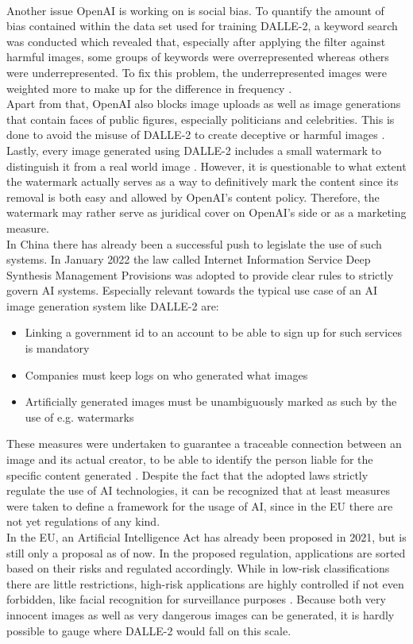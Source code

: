 \documentclass[10pt,twocolumn,twoside]{osajnl}
\begin{document}
\\
Another issue OpenAI is working on is social bias. To quantify the amount of bias contained within the data set used for training DALLE-2, a keyword search was conducted 
which revealed that, especially after applying the filter against harmful images, some groups of keywords were overrepresented whereas others were underrepresented. 
To fix this problem, the underrepresented images were weighted more to make up for the difference in frequency \cite{openaifilters}. 
\\
Apart from that, OpenAI also blocks image uploads as well as image generations that contain faces of public figures, especially politicians and celebrities. 
This is done to avoid the misuse of DALLE-2 to create deceptive or harmful images \cite{openaiimage}. 
\\
Lastly, every image generated using DALLE-2 includes a small watermark to distinguish it from a real world image \cite{openaicp}. 
However, it is questionable to what extent the watermark actually serves as a way to definitively mark the content since its removal is both easy and allowed by OpenAI's content policy.
Therefore, the watermark may rather serve as juridical cover on OpenAI's side or as a marketing measure.
\\
In China there has already been a successful push to legislate the use of such systems. In January 2022 the law called Internet Information Service Deep Synthesis Management Provisions was adopted to provide clear rules
to strictly govern AI systems. Especially relevant towards the typical use case of an AI image generation system like DALLE-2 are: 
\begin{itemize}
	\item Linking a government id to an account to be able to sign up for such services is mandatory
	\item Companies must keep logs on who generated what images
	\item Artificially generated images must be unambiguously marked as such by the use of e.g. watermarks 
\end{itemize}
These measures were undertaken to guarantee a traceable connection between an image and its actual creator, to be able to identify the person liable for the 
specific content generated \cite{CACGuidelines}. Despite the fact that the adopted laws strictly regulate the use of AI technologies, it can be recognized 
that at least measures were taken to define a framework for the usage of AI, since in the EU there are not yet regulations of any kind.
\\
In the EU, an Artificial Intelligence Act has already been proposed in 2021, but is still only a proposal as of now. 
In the proposed regulation, applications are sorted based on their risks and regulated accordingly. 
While in low-risk classifications there are little restrictions, high-risk applications are highly controlled if not even forbidden, like 
facial recognition for surveillance purposes \cite{EUAI}. 
Because both very innocent images as well as very dangerous images can be generated, it is hardly possible to gauge where DALLE-2 would fall on this scale.
\end{document}

